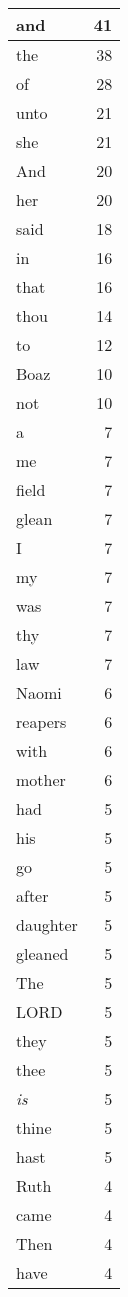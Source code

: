 \begin{center}
\begin{longtable}{l|r}
\hline \hline
\endlastfoot
and & 41 \\ \hline
the & 38 \\ \hline
of & 28 \\ \hline
unto & 21 \\ \hline
she & 21 \\ \hline
And & 20 \\ \hline
her & 20 \\ \hline
said & 18 \\ \hline
in & 16 \\ \hline
that & 16 \\ \hline
thou & 14 \\ \hline
to & 12 \\ \hline
Boaz & 10 \\ \hline
not & 10 \\ \hline
a & 7 \\ \hline
me & 7 \\ \hline
field & 7 \\ \hline
glean & 7 \\ \hline
I & 7 \\ \hline
my & 7 \\ \hline
was & 7 \\ \hline
thy & 7 \\ \hline
law & 7 \\ \hline
Naomi & 6 \\ \hline
reapers & 6 \\ \hline
with & 6 \\ \hline
mother & 6 \\ \hline
had & 5 \\ \hline
his & 5 \\ \hline
go & 5 \\ \hline
after & 5 \\ \hline
daughter & 5 \\ \hline
gleaned & 5 \\ \hline
The & 5 \\ \hline
LORD & 5 \\ \hline
they & 5 \\ \hline
thee & 5 \\ \hline
\emph{is} & 5 \\ \hline
thine & 5 \\ \hline
hast & 5 \\ \hline
Ruth & 4 \\ \hline
came & 4 \\ \hline
Then & 4 \\ \hline
have & 4 \\ \hline

\end{longtable}
\end{center}
